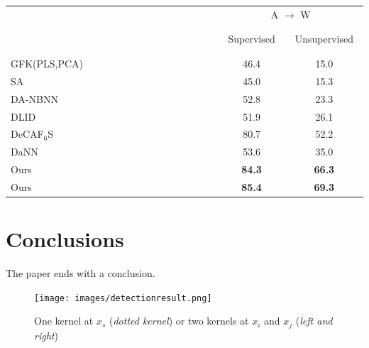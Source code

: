 \documentclass[runningheads]{llncs}
\begin{document}
\begin{table}
\centering
\begin{tabular}{l c c}
  \hline
   & \multicolumn{2}{c}{A $\rightarrow$ W}    \\
   \cline{2-3}
   ~~~~~~~~~~~~~~~~~~~~~~~~~~~~~~~
   ~~~~~~~~~~~~~~~~~~~~~~~~~~~~~~~
    & ~Supervised~ & ~Unsupervised~ \\
  \hline
  GFK(PLS,PCA)\cite{gong2012geodesic} & 46.4 & 15.0 \\
  SA \cite{fernando2013unsupervised} & 45.0 & 15.3 \\
  DA-NBNN \cite{tommasi2013frustratingly} & 52.8 & 23.3 \\
  DLID \cite{chopra2013dlid}& 51.9 & 26.1 \\
  DeCAF${}_{6}$S \cite{donahue2013decaf} & 80.7 & 52.2 \\
  DaNN \cite{ghifary2014domain}& 53.6 & 35.0 \\
  \hline
  Ours & {\bf 84.3} & {\bf 66.3} \\
  Ours & {\bf 85.4} & {\bf 69.3} \\
  \hline
\end{tabular}
\end{table}


\section{Conclusions}
\label{section:Conclusions}

The paper ends with a conclusion.

\begin{figure}
\centering
\texttt{[image: images/detectionresult.png]}
\caption{One kernel at $x_s$ ({\it dotted kernel}) or two kernels at
$x_i$ and $x_j$ ({\it left and right}) }
\label{fig:example}
\end{figure}



\end{document}
